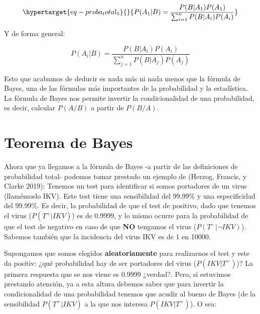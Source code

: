 \documentclass[
  letterpaper,
  DIV=11,
  numbers=noendperiod,
  oneside]{scrreprt}
\begin{document}
\begin{equation}\protect\hypertarget{eq-proba_total_5}{}{
P(A_1|B) = \frac{P(B|A_1) P(A_1)}{\sum_{i=1}^n P(B|A_i) P(A_i)}
}\label{eq-proba_total_5}\end{equation}

Y de forma general:

\[
P(A_i|B) = \frac{P(B|A_i) P(A_i)}{\sum_{j=1}^n P(B|A_j) P(A_j)}
\]

Esto que acabamos de deducir es nada más ni nada menos que la fórmula de
Bayes, una de las fórmulas más importantes de la probabilidad y la
estadística. La fórmula de Bayes nos permite invertir la condicionalidad
de una probabilidad, es decir, calcular \(P(A/B)\) a partir de
\(P(B/A)\).

\hypertarget{teorema-de-bayes}{%
\section{Teorema de Bayes}\label{teorema-de-bayes}}

Ahora que ya llegamos a la fórmula de Bayes -a partir de las
definiciones de probabilidad total- podemos tomar prestado un ejemplo de
(Herzog, Francis, y Clarke
2019):
Tenemos un test para identificar si somos portadores de un virus
(llamémoslo IKV). Este test tiene una sensibilidad del 99.99\% y una
especificidad del 99.99\%. Es decir, la probabilidad de que el test de
positivo, dado que tenemos el virus (\(P(T^+|IKV)\)) es de 0.9999, y lo
mismo ocurre para la probabilidad de que el test de negativo en caso de
que \textbf{NO} tengamos el virus (\(P(T^-|\neg IKV)\)). Sabemos también
que la incidencia del virus IKV es de 1 en 10000.

Supongamos que somos elegidos \textbf{aleatoriamente} para realizarnos
el test y este da positiv: ¿qué probabilidad hay de ser portadores del
virus (\(P(IKV|T^+)\))? La primera respuesta que se nos viene es 0.9999
¿verdad?. Pero, si estuvimos prestando atención, ya a esta altura
debemos saber que para invertir la condicionalidad de una probabilidad
tenemos que acudir al bueno de Bayes (de la sensibilidad \(P(T^+|IKV)\)
a la que nos interesa \(P(IKV|T^+)\)). O sea:
\end{document}
